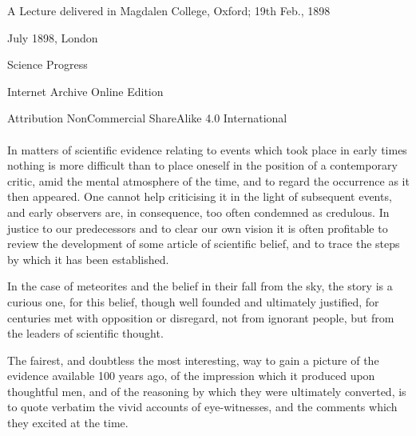 \documentclass[a4paper, 12pt, oneside]{article}
\begin{document}
\begin{titlepage}
        {\small A Lecture delivered in Magdalen College, Oxford; 19th Feb., 1898}
	
	
		
	\vspace*{\fill}%
	
	{\small July 1898, London}%
	
	{\small Science Progress} %

	\vspace{1\baselineskip} %

    Internet Archive Online Edition  %
	
	{\small Attribution NonCommercial ShareAlike 4.0 International } %
\end{titlepage}
\clearpage
\pagestyle{fancy}
\fancyhf{}
\cfoot{\Fontauri{\thepage}}
\Large
\paragraph{}
In matters of scientific evidence relating to events which took place in early times nothing is more difficult than to place oneself in the position of a contemporary critic, amid the mental atmosphere of the time, and to regard the occurrence as it then appeared. One cannot help criticising it in the light of subsequent events, and early observers are, in consequence, too often condemned as credulous. In justice to our predecessors and to clear our own vision it is often profitable to review the development of some article of scientific belief, and to trace the steps by which it has been established. 

In the case of meteorites and the belief in their fall from the sky, the story is a curious one, for this belief, though well founded and ultimately justified, for centuries met with opposition or disregard, not from ignorant people, but from the leaders of scientific thought. 

The fairest, and doubtless the most interesting, way to gain a picture of the evidence available 100 years ago, of the impression which it produced upon thoughtful men, and of the reasoning by which they were ultimately converted, is to quote verbatim the vivid accounts of eye-witnesses, and the comments which they excited at the time. 
\end{document}
